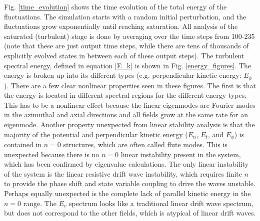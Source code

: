 \documentclass[showpacs,preprintnumbers,amsmath,amssymb,superscriptaddress]{revtex4}
\begin{document}
Fig. \ref{time_evolution} shows the time evolution of the total energy of the fluctuations. The simulation starts with a random initial perturbation, and the fluctuations grow
exponentially until reaching saturation. All analysis of the saturated (turbulent) stage is done by averaging over the time steps from 100-235 (note that these are just output time steps, while
there are tens of thousands of explicitly evolved states in between each of these output steps).
The turbulent spectral energy, defined in equation \ref{E_k} is shown in Fig. \ref{energy_figures}. The energy is broken up into its different types (e.g. perpendicular kinetic energy: $E_\phi$).
There are a few clear nonlinear properties
seen in these figures. The first is that the energy is located in different spectral regions for the different energy types. This has to be a nonlinear effect because the linear eigenmodes
are Fourier modes in the azimuthal and axial directions and all fields grow at the same rate for an eigenmode. 
Another property unexpected from linear stability analysis is that the majority of the potential and perpendicular kinetic energy ($E_n$, $E_t$, and $E_\phi$) is contained in $n=0$ structures, 
which are often called flute modes.
This is unexpected because there is no $n=0$ linear instability present in the system, which has been confirmed by eigenvalue calculations. The only linear instability of the system is the
linear resistive drift wave instability, which requires finite $n$ to provide the phase shift and state variable coupling to drive the waves unstable. Perhaps equally unexpected is the complete
lack of parallel kinetic energy in the $n=0$ range. The $E_v$ spectrum looks like a traditional linear drift wave spectrum, but does not correspond to the other fields, which is atypical of
linear drift waves.

\end{document}
